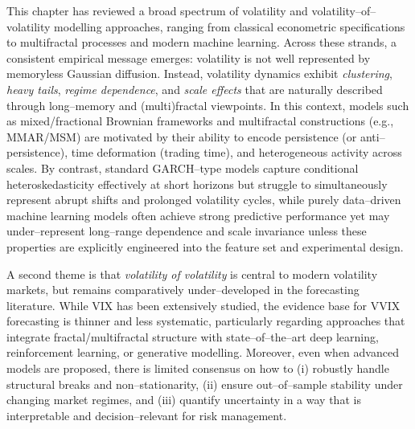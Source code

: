 \documentclass[12pt,a4paper]{report}
\numberwithin{equation}{section}
\begin{document}
This chapter has reviewed a broad spectrum of volatility and volatility--of--volatility modelling approaches, ranging from classical econometric specifications to multifractal processes and modern machine learning. Across these strands, a consistent empirical message emerges: volatility is not well represented by memoryless Gaussian diffusion. Instead, volatility dynamics exhibit \emph{clustering}, \emph{heavy tails}, \emph{regime dependence}, and \emph{scale effects} that are naturally described through long--memory and (multi)fractal viewpoints. In this context, models such as mixed/fractional Brownian frameworks and multifractal constructions (e.g., MMAR/MSM) are motivated by their ability to encode persistence (or anti--persistence), time deformation (trading time), and heterogeneous activity across scales. By contrast, standard GARCH--type models capture conditional heteroskedasticity effectively at short horizons but struggle to simultaneously represent abrupt shifts and prolonged volatility cycles, while purely data--driven machine learning models often achieve strong predictive performance yet may under--represent long--range dependence and scale invariance unless these properties are explicitly engineered into the feature set and experimental design.

A second theme is that \emph{volatility of volatility} is central to modern volatility markets, but remains comparatively under--developed in the forecasting literature. While VIX has been extensively studied, the evidence base for VVIX forecasting is thinner and less systematic, particularly regarding approaches that integrate fractal/multifractal structure with state--of--the--art deep learning, reinforcement learning, or generative modelling. Moreover, even when advanced models are proposed, there is limited consensus on how to (i) robustly handle structural breaks and non--stationarity, (ii) ensure out--of--sample stability under changing market regimes, and (iii) quantify uncertainty in a way that is interpretable and decision--relevant for risk management.
\end{document}
